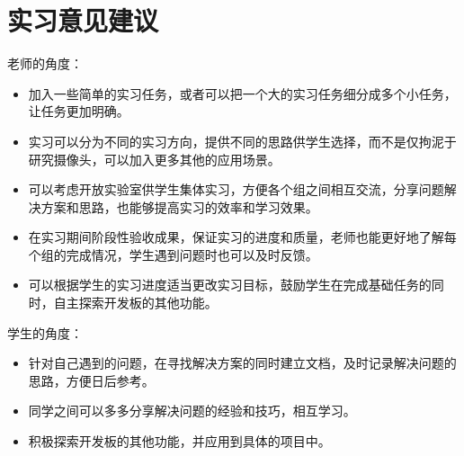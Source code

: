 \documentclass[UTF8]{article}
\begin{document}
%
\section{实习意见建议} 



\noindent 老师的角度：
\begin{itemize}
    \item 加入一些简单的实习任务，或者可以把一个大的实习任务细分成多个小任务，让任务更加明确。
    \item 实习可以分为不同的实习方向，提供不同的思路供学生选择，而不是仅拘泥于研究摄像头，可以加入更多其他的应用场景。
    \item 可以考虑开放实验室供学生集体实习，方便各个组之间相互交流，分享问题解决方案和思路，也能够提高实习的效率和学习效果。
    \item 在实习期间阶段性验收成果，保证实习的进度和质量，老师也能更好地了解每个组的完成情况，学生遇到问题时也可以及时反馈。
    \item 可以根据学生的实习进度适当更改实习目标，鼓励学生在完成基础任务的同时，自主探索开发板的其他功能。
\end{itemize}

\noindent 学生的角度：
\begin{itemize}
    \item 针对自己遇到的问题，在寻找解决方案的同时建立文档，及时记录解决问题的思路，方便日后参考。
    \item 同学之间可以多多分享解决问题的经验和技巧，相互学习。
    \item 积极探索开发板的其他功能，并应用到具体的项目中。
\end{itemize}

%
\end{document}
